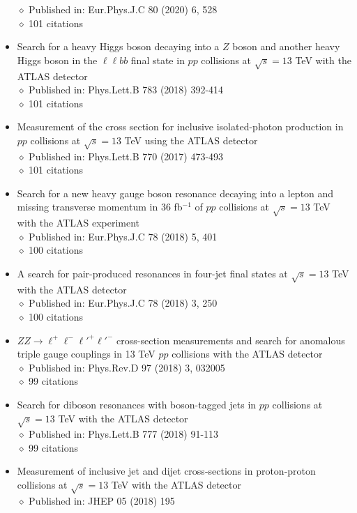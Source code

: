 \documentclass[margin, 10pt]{res} %
\begin{document}
\begin{resume}
\begin{itemize}
$\diamond$ Published in: Eur.Phys.J.C 80 (2020) 6, 528\\
$\diamond$ 101 citations
\item Search for a heavy Higgs boson decaying into a $Z$ boson and another heavy Higgs boson in the $\ell \ell bb$ final state in $pp$ collisions at $\sqrt{s} = 13$ TeV with the ATLAS detector\\
$\diamond$ Published in: Phys.Lett.B 783 (2018) 392-414\\
$\diamond$ 101 citations
\item Measurement of the cross section for inclusive isolated-photon production in $pp$ collisions at $\sqrt{s} = 13$ TeV using the ATLAS detector\\
$\diamond$ Published in: Phys.Lett.B 770 (2017) 473-493\\
$\diamond$ 101 citations
\item Search for a new heavy gauge boson resonance decaying into a lepton and missing transverse momentum in 36 fb$^{-1}$ of $pp$ collisions at $\sqrt{s} = 13$ TeV with the ATLAS experiment\\
$\diamond$ Published in: Eur.Phys.J.C 78 (2018) 5, 401\\
$\diamond$ 100 citations
\item A search for pair-produced resonances in four-jet final states at $\sqrt{s} = 13$ TeV with the ATLAS detector\\
$\diamond$ Published in: Eur.Phys.J.C 78 (2018) 3, 250\\
$\diamond$ 100 citations
\item $ZZ \rightarrow \ell^{+}\ell^{-}\ell'^{+}\ell'^{-}$ cross-section measurements and search for anomalous triple gauge couplings in 13 TeV $pp$ collisions with the ATLAS detector\\
$\diamond$ Published in: Phys.Rev.D 97 (2018) 3, 032005\\
$\diamond$ 99 citations
\item Search for diboson resonances with boson-tagged jets in $pp$ collisions at $\sqrt{s} = 13$ TeV with the ATLAS detector\\
$\diamond$ Published in: Phys.Lett.B 777 (2018) 91-113\\
$\diamond$ 99 citations
\item Measurement of inclusive jet and dijet cross-sections in proton-proton collisions at $\sqrt{s} = 13$ TeV with the ATLAS detector\\
$\diamond$ Published in: JHEP 05 (2018) 195\\

\end{itemize}
\end{resume}
\end{document}
